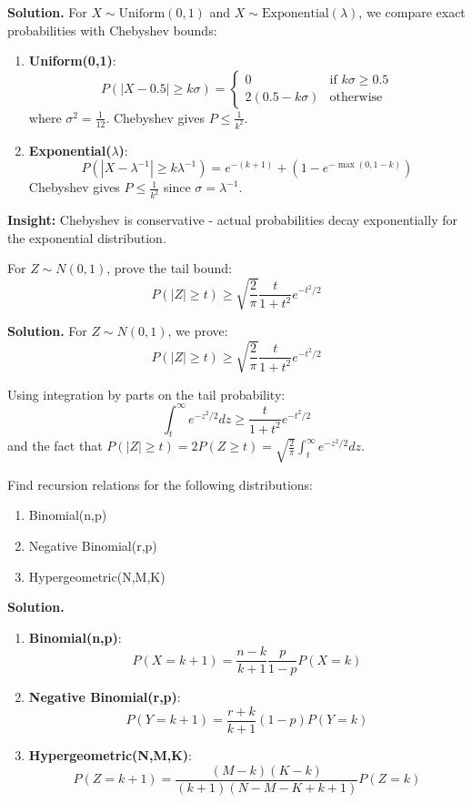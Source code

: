 \noindent\textbf{Solution.}
For $X \sim \text{Uniform}(0,1)$ and $X \sim \text{Exponential}(\lambda)$, we compare exact probabilities with Chebyshev bounds:

\begin{enumerate}
\item \textbf{Uniform(0,1)}:
\[ P(|X-0.5| \geq k\sigma) = 
\begin{cases} 
0 & \text{if } k\sigma \geq 0.5 \\
2(0.5 - k\sigma) & \text{otherwise}
\end{cases}
\]
where $\sigma^2 = \frac{1}{12}$. Chebyshev gives $P \leq \frac{1}{k^2}$.

\item \textbf{Exponential($\lambda$)}:
\[ P(|X-\lambda^{-1}| \geq k\lambda^{-1}) = e^{-(k+1)} + (1 - e^{-\max(0,1-k)}) \]
Chebyshev gives $P \leq \frac{1}{k^2}$ since $\sigma = \lambda^{-1}$.
\end{enumerate}

\textbf{Insight:} Chebyshev is conservative - actual probabilities decay exponentially for the exponential distribution.

\begin{problembox}
For $Z \sim N(0,1)$, prove the tail bound:
\[ P(|Z| \geq t) \geq \sqrt{\frac{2}{\pi}}\frac{t}{1+t^2}e^{-t^2/2} \]
\end{problembox}

\noindent\textbf{Solution.}
For $Z \sim N(0,1)$, we prove:
\[ P(|Z| \geq t) \geq \sqrt{\frac{2}{\pi}}\frac{t}{1+t^2}e^{-t^2/2} \]

Using integration by parts on the tail probability:
\[ \int_t^\infty e^{-z^2/2}dz \geq \frac{t}{1+t^2}e^{-t^2/2} \]
and the fact that $P(|Z|\geq t) = 2P(Z\geq t) = \sqrt{\frac{2}{\pi}}\int_t^\infty e^{-z^2/2}dz$.

\begin{problembox}
Find recursion relations for the following distributions:
\begin{enumerate}
\item Binomial(n,p)
\item Negative Binomial(r,p)
\item Hypergeometric(N,M,K)
\end{enumerate}
\end{problembox}

\noindent\textbf{Solution.}
\begin{enumerate}
\item \textbf{Binomial(n,p)}:
\[ P(X=k+1) = \frac{n-k}{k+1}\frac{p}{1-p}P(X=k) \]

\item \textbf{Negative Binomial(r,p)}:
\[ P(Y=k+1) = \frac{r+k}{k+1}(1-p)P(Y=k) \]

\item \textbf{Hypergeometric(N,M,K)}:
\[ P(Z=k+1) = \frac{(M-k)(K-k)}{(k+1)(N-M-K+k+1)}P(Z=k) \]
\end{enumerate}

